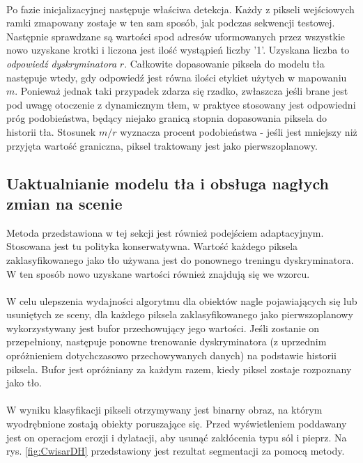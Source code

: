 \paragraph{}
Po fazie inicjalizacyjnej następuje właściwa detekcja. Każdy z pikseli wejściowych ramki zmapowany zostaje w ten sam sposób, jak podczas sekwencji testowej. Następnie sprawdzane są wartości spod adresów uformowanych przez wszystkie nowo uzyskane krotki i liczona jest ilość wystąpień liczby '1'. Uzyskana liczba to \textit{odpowiedź dyskryminatora} $r$. Całkowite dopasowanie piksela do modelu tła następuje wtedy, gdy odpowiedź jest równa ilości etykiet użytych w mapowaniu $m$. Ponieważ jednak taki przypadek zdarza się rzadko, zwłaszcza jeśli brane jest pod uwagę otoczenie z dynamicznym tłem, w praktyce stosowany jest odpowiedni próg podobieństwa, będący niejako granicą stopnia dopasowania piksela do historii tła. Stosunek $m/r$ wyznacza procent podobieństwa - jeśli jest mniejszy niż przyjęta wartość graniczna, piksel traktowany jest jako pierwszoplanowy.
\subsection{Uaktualnianie modelu tła i obsługa nagłych zmian na scenie}
Metoda przedstawiona w tej sekcji jest również podejściem adaptacyjnym. Stosowana jest tu polityka konserwatywna. Wartość każdego piksela zaklasyfikowanego jako tło używana jest do ponownego treningu dyskryminatora. W ten sposób nowo uzyskane wartości również znajdują się we wzorcu.
\paragraph{}
W celu ulepszenia wydajności algorytmu dla obiektów nagle pojawiających się lub usuniętych ze sceny, dla każdego piksela zaklasyfikowanego jako pierwszoplanowy wykorzystywany jest bufor przechowujący jego wartości. Jeśli zostanie on przepełniony, następuje ponowne trenowanie dyskryminatora (z uprzednim opróżnieniem dotychczasowo przechowywanych danych) na podstawie historii piksela. Bufor jest opróżniany za każdym razem, kiedy piksel zostaje rozpoznany jako tło.
\paragraph{}
W wyniku klasyfikacji pikseli otrzymywany jest binarny obraz, na którym wyodrębnione zostają obiekty poruszające się. Przed wyświetleniem poddawany jest on operacjom erozji i dylatacji, aby usunąć zakłócenia typu sól i pieprz. Na rys. \ref{fig:CwisarDH} przedstawiony jest rezultat segmentacji za pomocą metody. 

